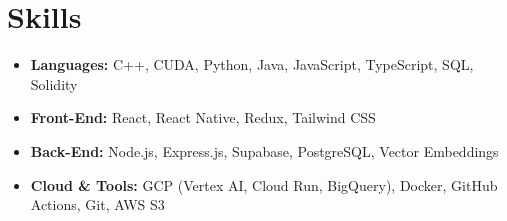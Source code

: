 \documentclass[10pt]{article}
\begin{document}
\vspace{-16pt}

\section*{Skills}
\begin{itemize}[leftmargin=*, nosep, itemsep=2pt]
    \item \textbf{Languages:} C++, CUDA, Python, Java, JavaScript, TypeScript, SQL, Solidity
    \item \textbf{Front-End:} React, React Native, Redux, Tailwind CSS
    \item \textbf{Back-End:} Node.js, Express.js, Supabase, PostgreSQL, Vector Embeddings
    \item \textbf{Cloud \& Tools:} GCP (Vertex AI, Cloud Run, BigQuery), Docker, GitHub Actions, Git, AWS S3
\end{itemize}
\end{document}
